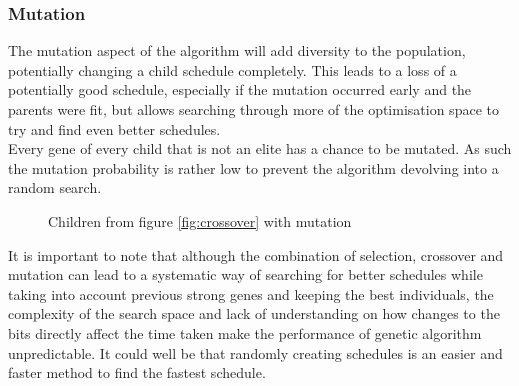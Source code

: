 \documentclass{article}
\def\listset{\pgfqkeys{/List}}
\newcommand{\n}[0]{\\[\baselineskip]}
\begin{document}
\subsubsection{Mutation}
The mutation aspect of the algorithm will add diversity to the population, potentially changing a child schedule completely. This leads to a loss of a potentially good schedule, especially if the mutation occurred early and the parents were fit, but allows searching through more of the optimisation space to try and find even better schedules.
\n
Every gene of every child that is not an elite has a chance to be mutated. As such the mutation probability is rather low to prevent the algorithm devolving into a random search.
\begin{figure}[H]
\centering
{}
\caption{Children from figure \ref{fig:crossover} with mutation}
\label{fig:mutation}
\end{figure}
\noindent It is important to note that although the combination of selection, crossover and mutation can lead to a systematic way of searching for better schedules while taking into account previous strong genes and keeping the best individuals, the complexity of the search space and lack of understanding on how changes to the bits directly affect the time taken make the performance of genetic algorithm unpredictable. It could well be that randomly creating schedules is an easier and faster method to find the fastest schedule. 
\end{document}
